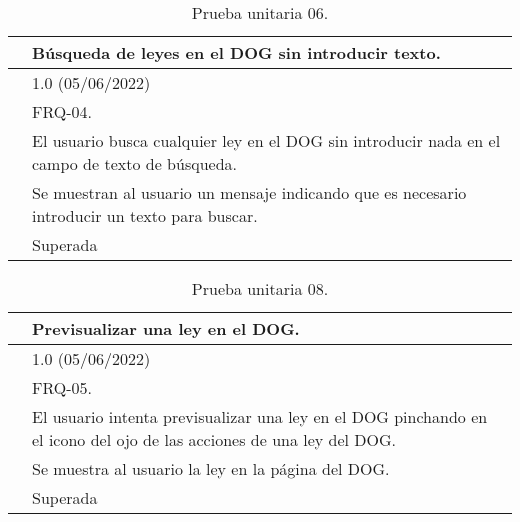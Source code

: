 \begin{table}[H]
\begin{center}
\begin{tabular}{|p{3cm}|p{10cm}|} \hline
\centering {\bf PU-07} & Búsqueda de leyes en el DOG sin introducir texto.  \\ \hline\hline
\centering {\bf Versión} & 1.0 (05/06/2022) \\ \hline
\centering {\bf Dependencias} & FRQ-04. \\ \hline
\centering {\bf Descripción} &  El usuario busca cualquier ley en el DOG sin introducir nada en el campo de texto de búsqueda. \\ \hline
\centering {\bf Criterio de aceptación} & Se muestran al usuario un mensaje indicando que es necesario introducir un texto para buscar. \\ \hline
\centering {\bf Estado} & Superada \\ \hline
\end{tabular}
\caption{Prueba unitaria 06.}
\label{enlacePU7}
\end{center}
\end{table}

\begin{table}[H]
\begin{center}
\begin{tabular}{|p{3cm}|p{10cm}|} \hline
\centering {\bf PU-08} & Previsualizar una ley en el DOG.  \\ \hline\hline
\centering {\bf Versión} & 1.0 (05/06/2022) \\ \hline
\centering {\bf Dependencias} & FRQ-05. \\ \hline
\centering {\bf Descripción} &  El usuario intenta previsualizar una ley en el DOG pinchando en el icono del ojo de las acciones de una ley del DOG. \\ \hline
\centering {\bf Criterio de aceptación} & Se muestra al usuario la ley en la página del DOG. \\ \hline
\centering {\bf Estado} & Superada \\ \hline
\end{tabular}
\caption{Prueba unitaria 08.}
\label{enlacePU8}
\end{center}
\end{table}


